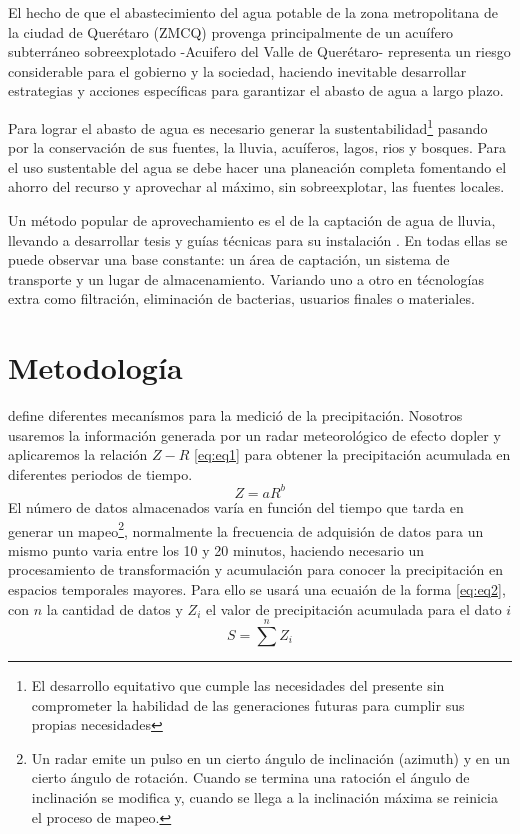 \documentclass[letterpaper,12pt,oneside]{book}
\begin{document}
    El hecho de que el abastecimiento del agua potable de la zona metropolitana de la ciudad de Querétaro (ZMCQ) provenga principalmente de un acuífero subterráneo sobreexplotado -Acuifero del Valle de Querétaro- representa un riesgo considerable para el gobierno y la sociedad, haciendo inevitable desarrollar estrategias y acciones específicas para garantizar el abasto de agua a largo plazo.

    Para lograr el abasto de agua es necesario generar la sustentabilidad\footnote{El desarrollo equitativo que cumple las necesidades del presente sin comprometer la habilidad de las generaciones futuras para cumplir sus propias necesidades} pasando por la conservación de sus fuentes, la lluvia, acuíferos, lagos, rios y bosques. Para el uso sustentable del agua se debe hacer una planeación completa fomentando el ahorro del recurso y aprovechar al máximo, sin sobreexplotar, las fuentes locales.

    Un método popular de aprovechamiento es el de la captación de agua de lluvia, llevando a desarrollar tesis \cite{comision2016lineamientos} \cite{hugues2019captacion} \cite{nickisch2018sistemas} \cite{van2013captacion} y guías técnicas para su instalación \cite{queralt2011agua} \cite{unatsabar2004guia}. En todas ellas se puede observar una base constante: un área de captación, un sistema de transporte y un lugar de almacenamiento. Variando uno a otro en técnologías extra como filtración, eliminación de bacterias, usuarios finales o materiales.
\chapter*{Metodología}
    \cite{omm2014guia} define diferentes mecanísmos para la medició de la precipitación. Nosotros usaremos la información generada por un radar meteorológico de efecto dopler y aplicaremos la relación $Z-R$ \ref{eq:eq1} para obtener la precipitación acumulada en diferentes periodos de tiempo.
    \begin{equation}
        Z= aR^b
        \label{eq:eq1}
    \end{equation}
    El número de datos almacenados varía en función del tiempo que tarda en generar un mapeo\footnote{Un radar emite un pulso en un cierto ángulo de inclinación (azimuth) y en un cierto ángulo de rotación. Cuando se termina una ratoción el ángulo de inclinación se modifica y, cuando se llega a la inclinación máxima se reinicia el proceso de mapeo.}, normalmente la frecuencia de adquisión de datos para un mismo punto varia entre los 10 y 20 minutos, haciendo necesario un procesamiento de transformación y acumulación para conocer la precipitación en espacios temporales mayores. Para ello se usará una ecuaión de la forma \ref{eq:eq2}, con $n$ la cantidad de datos y $Z_i$ el valor de precipitación acumulada para el dato $i$
    \begin{equation}
        S= \sum^n Z_i
        \label{eq:eq2}
    \end{equation}
    
\end{document}
